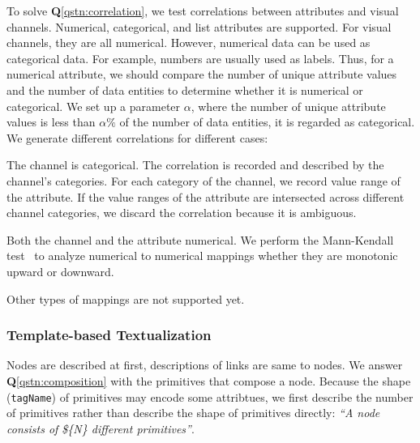 To solve \textbf{Q}\ref{qstn:correlation}, we test correlations between attributes and visual channels.
Numerical, categorical, and list attributes are supported.
For visual channels, they are all numerical.
However, numerical data can be used as categorical data.
For example, numbers are usually used as labels.
Thus, for a numerical attribute, we should compare the number of unique attribute values and the number of data entities to determine whether it is numerical or categorical.
We set up a parameter $\alpha$, where the number of unique attribute values is less than $\alpha \%$ of the number of data entities, it is regarded as categorical.
We generate different correlations for different cases:
\begin{compactitem}
    \item The channel is categorical. The correlation is recorded and described by the channel's categories. For each category of the channel, we record value range of the attribute. %
    If the value ranges of the attribute are intersected across different channel categories, we discard the correlation because it is ambiguous.
    \item Both the channel and the attribute numerical. We perform the Mann-Kendall test~\cite{10.2307/1907187, kendall1948rank} to analyze numerical to numerical mappings whether they are monotonic upward or downward.
    \item Other types of mappings are not supported yet.
\end{compactitem}


\subsubsection {Template-based Textualization}
Nodes are described at first, descriptions of links are same to nodes.
We answer \textbf{Q}\ref{qstn:composition} with the primitives that compose a node.
Because the shape (\texttt{tagName}) of primitives may encode some attribtues, we first describe the number of primitives rather than describe the shape of primitives directly:
\textit{``A node consists of \$\{N\} different primitives''}. 

